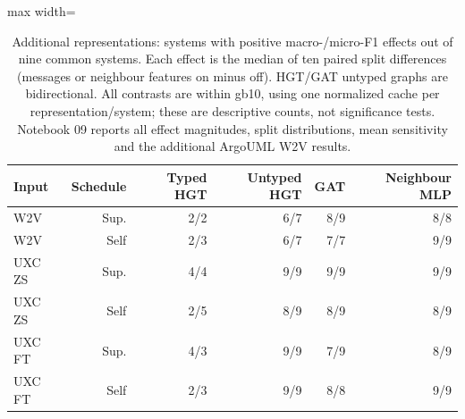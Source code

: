 \begin{table}[t]
\centering\small
\caption{Additional representations: systems with positive macro-/micro-F1 effects out of nine common systems. Each effect is the median of ten paired split differences (messages or neighbour features on minus off). HGT/GAT untyped graphs are bidirectional. All contrasts are within gb10, using one normalized cache per representation/system; these are descriptive counts, not significance tests. Notebook 09 reports all effect magnitudes, split distributions, mean sensitivity and the additional ArgoUML W2V results.\label{tab:embedding_controls}}
\begin{adjustbox}{max width=\textwidth}
\begin{tabular}{lrrrrr}
\toprule
Input & Schedule & Typed HGT & Untyped HGT & GAT & Neighbour MLP \\
\midrule
W2V & Sup. & 2/2 & 6/7 & 8/9 & 8/8 \\
W2V & Self & 2/3 & 6/7 & 7/7 & 9/9 \\
UXC ZS & Sup. & 4/4 & 9/9 & 9/9 & 9/9 \\
UXC ZS & Self & 2/5 & 8/9 & 8/9 & 8/9 \\
UXC FT & Sup. & 4/3 & 9/9 & 7/9 & 8/9 \\
UXC FT & Self & 2/3 & 9/9 & 8/8 & 9/9 \\
\bottomrule
\end{tabular}
\end{adjustbox}
\end{table}
